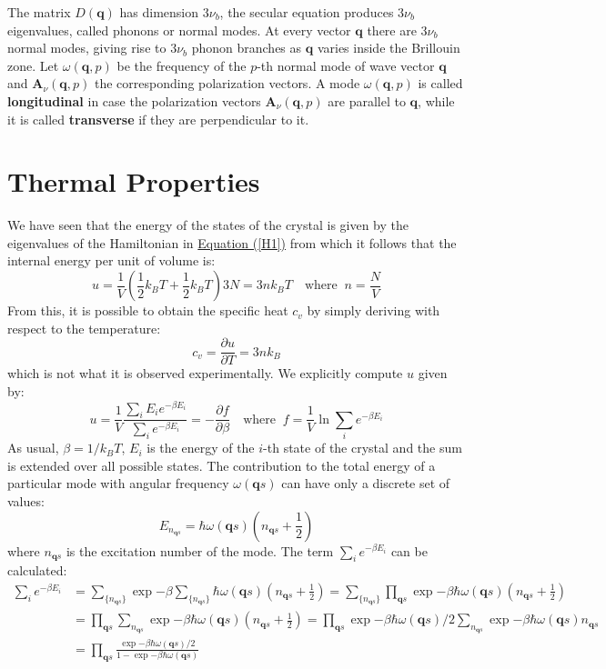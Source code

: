 \documentclass[10.75pt,a4paper,openright,bottom=2cm]{article}
\renewcommand{\Vec}[1]{\boldsymbol{#1}}
\begin{document}
The matrix $D(\Vec{q})$ has dimension $3\nu_b$, the secular equation produces $3\nu_b$ eigenvalues, called phonons or normal modes. At every vector $\Vec{q}$ there are $3\nu_b$ normal modes, giving rise to $3\nu_b$ phonon branches as $\Vec{q}$ varies inside the  Brillouin zone. Let $\omega(\Vec{q},p)$ be the frequency of the $p$-th normal mode of wave vector $\Vec{q}$ and $\Vec{A}_\nu(\Vec{q},p)$ the corresponding polarization vectors. A mode $\omega(\Vec{q},p)$ is called \textbf{longitudinal} in case the polarization vectors $\Vec{A}_\nu(\Vec{q},p)$ are parallel to $\Vec{q}$, while it is called \textbf{transverse} if they are perpendicular to it.
\section{Thermal Properties}
We have seen that the energy of the states of the crystal is given by the eigenvalues of the Hamiltonian in \hyperref[H1]{Equation (\ref{H1})} from which it follows that the internal energy per unit of volume is:
\[
u=\frac{1}{V}\left(\frac{1}{2}k_BT+\frac{1}{2}k_BT\right)3N=3nk_BT \quad \text{where}\;\;n=\frac{N}{V}
\]
From this, it is possible to obtain the specific heat $c_v$ by simply deriving with respect to the temperature:
\[
c_v=\frac{\partial u}{\partial T}=3nk_B
\]
which is not what it is observed experimentally. We explicitly compute $u$ given by:
\[
u=\frac{1}{V}\frac{\sum_iE_ie^{-\beta E_i}}{\sum_ie^{-\beta E_i}}=-\frac{\partial f}{\partial\beta} \quad \text{where}\;\;f=\frac{1}{V}\ln{\sum_ie^{-\beta E_i}}
\]
As usual, $\beta=1/k_BT$, $E_i$ is the energy of the $i$-th state of the crystal and the sum is extended over all possible states. The contribution to the total energy of a particular mode with angular frequency $\omega(\Vec{q}s)$ can have only a discrete set of values:
\[
E_{n_{\Vec{q}s}}=\hbar\omega(\Vec{q}s)\left(n_{\Vec{q}s}+\frac{1}{2}\right)
\]
where $n_{\Vec{q}s}$ is the excitation number of the mode. The term $\sum_ie^{-\beta E_i}$ can be calculated:
\begin{align*}
\sum_ie^{-\beta E_i}&=\sum_{\{n_{\Vec{q}s}\}}\exp{-\beta\sum_{\{n_{\Vec{q}s}\}}\hbar\omega(\Vec{q}s)\left(n_{\Vec{q}s}+\frac{1}{2}\right)}=\sum_{\{n_{\Vec{q}s}\}}\prod_{\Vec{q}s}\exp{-\beta\hbar\omega(\Vec{q}s)\left(n_{\Vec{q}s}+\frac{1}{2}\right)}\\
&=\prod_{\Vec{q}s}\sum_{n_{\Vec{q}s}}\exp{-\beta\hbar\omega(\Vec{q}s)\left(n_{\Vec{q}s}+\frac{1}{2}\right)}=\prod_{\Vec{q}s}\exp{-\beta\hbar\omega(\Vec{q}s)/2}\sum_{n_{\Vec{q}s}}\exp{-\beta\hbar\omega(\Vec{q}s)n_{\Vec{q}s}}\\
&=\prod_{\Vec{q}s}\frac{\exp{-\beta\hbar\omega(\Vec{q}s)/2}}{1-\exp{-\beta\hbar\omega(\Vec{q}s)}}
\end{align*}
\end{document}
